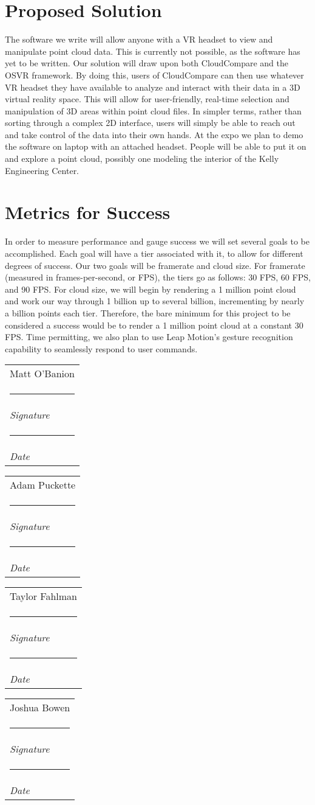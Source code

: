 \documentclass{article}
\makeatletter
\newcommand{\namesigdate}[2][5cm]{%
  \begin{tabular}{@{}p{#1}@{}}
    #2 \\[2\normalbaselineskip] \hrule \\[0pt]
    {\small \textit{Signature}} \\[2\normalbaselineskip] \hrule \\[0pt]
    {\small \textit{Date}}
  \end{tabular}
}
\makeatother
\begin{document}
\section*{Proposed Solution}

The software we write will allow anyone with a VR headset to view and manipulate point cloud data. This is currently not possible, as the software has yet to be written. Our solution will draw upon both CloudCompare and the OSVR framework. By doing this, users of CloudCompare can then use whatever VR headset they have available to analyze and interact with their data in a 3D virtual reality space. This will allow for user-friendly, real-time selection and manipulation of 3D areas within point cloud files. In simpler terms, rather than sorting through a complex 2D interface, users will simply be able to reach out and take control of the data into their own hands. At the expo we plan to demo the software on laptop with an attached headset. People will be able to put it on and explore a point cloud, possibly one modeling the interior of the Kelly Engineering Center. 

\section*{Metrics for Success}

In order to measure performance and gauge success we will set several goals to be accomplished. Each goal will have a tier associated with it, to allow for different degrees of success. Our two goals will be framerate and cloud size. For framerate (measured in frames-per-second, or FPS), the tiers go as follows: 30 FPS, 60 FPS, and 90 FPS. For cloud size, we will begin by rendering a 1 million point cloud and work our way through 1 billion up to several billion, incrementing by nearly a billion points each tier. Therefore, the bare minimum for this project to be considered a success would be to render a 1 million point cloud at a constant 30 FPS. Time permitting, we also plan to use Leap Motion's gesture recognition capability to seamlessly respond to user commands.

\vspace{2pc}

\noindent \namesigdate{Matt O'Banion} \hfill \namesigdate[3cm]{Adam Puckette}

\vspace{2pc}

\noindent \namesigdate{Taylor Fahlman} \hfill \namesigdate[3cm]{Joshua Bowen}
\end{document}
